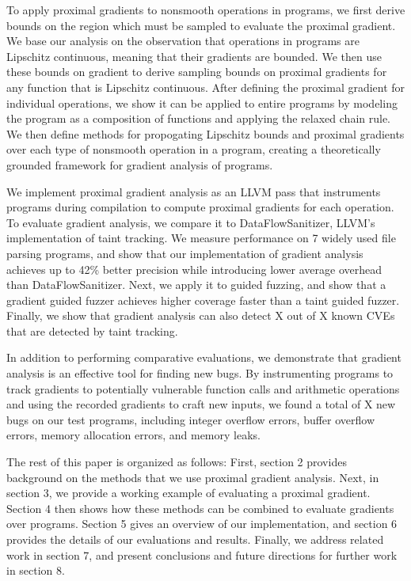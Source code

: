 To apply proximal gradients to nonsmooth operations in programs, we first derive bounds on the region which must be sampled to evaluate the proximal gradient. We base our analysis on the observation that operations in programs are Lipschitz continuous, meaning that their gradients are bounded. We then use these bounds on gradient to derive sampling bounds on proximal gradients for any function that is Lipschitz continuous. After defining the proximal gradient for individual operations, we show it can be applied to entire programs by modeling the program as a composition of functions and applying the relaxed chain rule. We then define methods for propogating Lipschitz bounds and proximal gradients over each type of nonsmooth operation in a program, creating a theoretically grounded framework for gradient analysis of programs.

We implement proximal gradient analysis as an LLVM pass that instruments programs during compilation to compute proximal gradients for each operation. To evaluate gradient analysis, we compare it to DataFlowSanitizer, LLVM's implementation of taint tracking. We measure performance on 7 widely used file parsing programs, and show that our implementation of gradient analysis achieves up to 42\% better precision while introducing lower average overhead than DataFlowSanitizer. Next, we apply it to guided fuzzing, and show that a gradient guided fuzzer achieves higher coverage faster than a taint guided fuzzer. Finally, we show that gradient analysis can also detect X out of X known CVEs that are detected by taint tracking.

In addition to performing comparative evaluations, we demonstrate that gradient analysis is an effective tool for finding new bugs. By instrumenting programs to track gradients to potentially vulnerable function calls and arithmetic operations and using the recorded gradients to craft new inputs, we found a total of X new bugs on our test programs, including integer overflow errors, buffer overflow errors, memory allocation errors, and memory leaks.

The rest of this paper is organized as follows: First, section 2 provides background on the methods that we use proximal gradient analysis. Next, in section 3, we provide a working example of evaluating a proximal gradient. Section 4 then shows how these methods can be combined to evaluate gradients over programs. Section 5 gives an overview of our implementation, and section 6 provides the details of our evaluations and results. Finally, we address related work in section 7, and present conclusions and future directions for further work in section 8.

